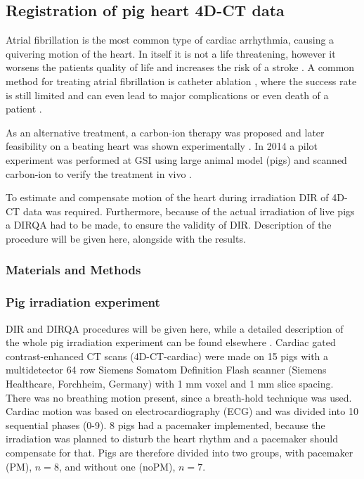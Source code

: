 \newpage
\subsection{Registration of pig heart 4D-CT data}

Atrial fibrillation is the most common type of cardiac arrhythmia, causing a quivering motion of the heart. In itself it is not a life threatening, however it worsens the patients quality of life and increases the risk of a stroke \cite{Benjamin1998}. A common method for treating atrial fibrillation is catheter ablation \cite{January2014}, 
where the success rate is still limited and can even lead to major complications or even death of a patient \cite{Cappato2005,Cappato2010}.

As an alternative treatment, a carbon-ion therapy was proposed \cite{Bert2012} and later feasibility on a beating heart was shown experimentally \cite{Lehmann2015b}. In 2014 a pilot experiment was performed at GSI using large animal model (pigs) and
scanned carbon-ion to verify the treatment in vivo \cite{Lehmann2015}.

To estimate and compensate motion of the heart during irradiation DIR of 4D-CT data was required. Furthermore, because of the actual irradiation of live pigs a DIRQA had to be made, to ensure the validity of DIR. Description of the procedure will be given here,
alongside with the results.


\subsubsection{Materials and Methods}


\subsubsection{Pig irradiation experiment}

DIR and DIRQA procedures will be given here, while a detailed description of the whole pig irradiation experiment can be found elsewhere \cite{Lehmann2015}. Cardiac gated contrast-enhanced CT scans (4D-CT-cardiac) were made on 15 pigs with a multidetector 64 row Siemens Somatom Definition Flash scanner 
(Siemens Healthcare, Forchheim, Germany) with 1 mm voxel and 1 mm slice spacing. There was no breathing motion present, since a breath-hold technique was used. Cardiac motion was based on electrocardiography (ECG)
and was divided into 10 sequential phases (0-9). 
8 pigs had a pacemaker implemented, because the irradiation was planned to disturb the heart rhythm and a pacemaker should compensate for that. Pigs are therefore divided into two groups, with pacemaker (PM), $n=8$, and without one (noPM), $n=7$.

